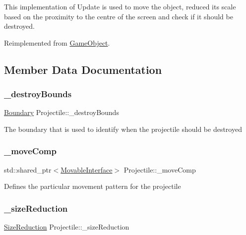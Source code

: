 This implementation of Update is used to move the object, reduced its scale based on the proximity to the centre of the screen and check if it should be destroyed. 

Reimplemented from \hyperlink{class_game_object_ac7ecc123dacaba955077420caabf5e64}{Game\+Object}.



\subsection{Member Data Documentation}
\mbox{\label{class_projectile_a2904a8119d6703c781e4d54c345b75b7}} 
\subsubsection{\texorpdfstring{\+\_\+destroy\+Bounds}{\_destroyBounds}}
{\footnotesize\ttfamily \hyperlink{class_boundary}{Boundary} Projectile\+::\+\_\+destroy\+Bounds\hspace{0.3cm}{\ttfamily [protected]}}

The boundary that is used to identify when the projectile should be destroyed \mbox{\label{class_projectile_afd6f6c2b3c202adb129a9cbfcd62ea1f}} 
\subsubsection{\texorpdfstring{\+\_\+move\+Comp}{\_moveComp}}
{\footnotesize\ttfamily std\+::shared\+\_\+ptr$<$\hyperlink{class_movable_interface}{Movable\+Interface}$>$ Projectile\+::\+\_\+move\+Comp\hspace{0.3cm}{\ttfamily [private]}}

Defines the particular movement pattern for the projectile \mbox{\label{class_projectile_adaf2c52cd2491197174be5a5faeca052}} 
\subsubsection{\texorpdfstring{\+\_\+size\+Reduction}{\_sizeReduction}}
{\footnotesize\ttfamily \hyperlink{class_size_reduction}{Size\+Reduction} Projectile\+::\+\_\+size\+Reduction\hspace{0.3cm}{\ttfamily [private]}}

